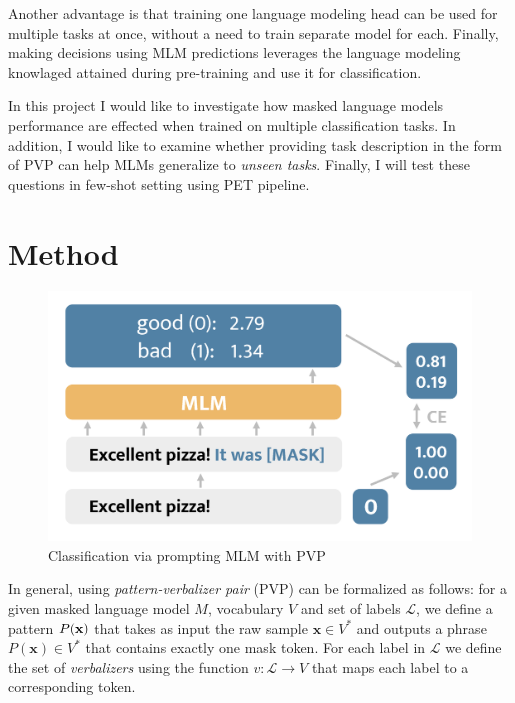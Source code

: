 \documentclass[11pt,a4paper]{article}
\begin{document}
Another advantage is that training one language modeling head can be used for multiple tasks at once, without a need to train separate model for each.
Finally, making decisions using MLM predictions leverages the language modeling knowlaged attained during pre-training and use it for classification.

In this project I would like to investigate how masked language models performance are effected when trained on multiple classification tasks.
In addition, I would like to examine whether providing task description in the form of PVP can help MLMs generalize to \textit{unseen tasks}.
Finally, I will test these questions in few-shot setting using PET pipeline.








\section{Method}

\begin{figure}[b]
	\centering
	\includegraphics[width=\linewidth]{mlm_classification}
	\caption{Classification via prompting MLM with PVP}
	\label{normal_case}
\end{figure}

In general, using \textit{pattern-verbalizer pair} (PVP) can be formalized as follows: for a given masked language model $M$, vocabulary $V$ and set of labels $\mathcal{L}$, we define a pattern $P(\textbf{\text{x}})$ that takes as input the raw sample $\textbf{x}\in{}V^*$ and outputs a phrase $P(\textbf{x})\in{}V^*$ that contains exactly one mask token.
For each label in $\mathcal{L}$ we define the set of \textit{verbalizers} using the function $v:\mathcal{L}\rightarrow{}V$ that maps each label to a corresponding token.
\end{document}
